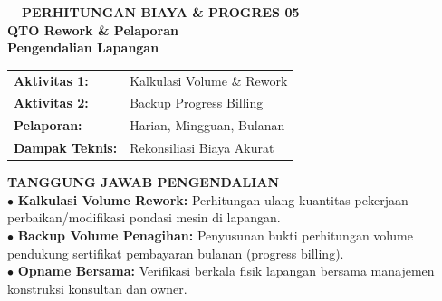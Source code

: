 \documentclass[10pt,a4paper,landscape]{article}
\begin{document}
\noindent
\begin{minipage}[t]{0.30\linewidth}
  \vspace{0pt}
  \begin{tcolorbox}[sharp corners, boxrule=0.8pt, colframe=pborder, colback=white, left=3mm, right=3mm, top=2.5mm, bottom=2.5mm, height=98mm]
    \colorbox{pred}{\fontsize{7pt}{8pt}\selectfont\bfseries\color{white}\ \ PERHITUNGAN BIAYA \& PROGRES 05\ \ }\\[1.5mm]
    {\fontsize{9.5pt}{11.5pt}\selectfont\bfseries\color{pnavy}QTO Rework \& Pelaporan}\\[0.5mm]
    {\fontsize{7pt}{8.5pt}\selectfont\bfseries\color{pred}Pengendalian Lapangan}\\[2mm]

    \begin{tcolorbox}[sharp corners, boxrule=0.5pt, colframe=pborder, colback=pbglight, left=2mm, right=2mm, top=1.5mm, bottom=1.5mm]
      \begin{tabularx}{\linewidth}{@{}p{22mm} X@{}}
        {\fontsize{6.8pt}{8pt}\selectfont\bfseries Aktivitas 1:} & {\fontsize{6.8pt}{8pt}\selectfont Kalkulasi Volume \& Rework} \\[0.8mm]
        {\fontsize{6.8pt}{8pt}\selectfont\bfseries Aktivitas 2:} & {\fontsize{6.8pt}{8pt}\selectfont Backup Progress Billing} \\[0.8mm]
        {\fontsize{6.8pt}{8pt}\selectfont\bfseries Pelaporan:} & {\fontsize{6.8pt}{8pt}\selectfont Harian, Mingguan, Bulanan} \\[0.8mm]
        {\fontsize{6.8pt}{8pt}\selectfont\bfseries Dampak Teknis:} & {\fontsize{6.8pt}{8pt}\selectfont Rekonsiliasi Biaya Akurat}
      \end{tabularx}
    \end{tcolorbox}
    \vspace{1.5mm}

    {\fontsize{7.5pt}{9pt}\selectfont\bfseries\color{pnavy}TANGGUNG JAWAB PENGENDALIAN}\\[0.8mm]
    {\fontsize{6.5pt}{8.2pt}\selectfont\color{psteel}
    $\bullet$ \textbf{Kalkulasi Volume Rework:} Perhitungan ulang kuantitas pekerjaan perbaikan/modifikasi pondasi mesin di lapangan.\\
    $\bullet$ \textbf{Backup Volume Penagihan:} Penyusunan bukti perhitungan volume pendukung sertifikat pembayaran bulanan (progress billing).\\
    $\bullet$ \textbf{Opname Bersama:} Verifikasi berkala fisik lapangan bersama manajemen konstruksi konsultan dan owner.
    }
  \end{tcolorbox}
  \vspace{2mm}


\end{minipage}
\end{document}
